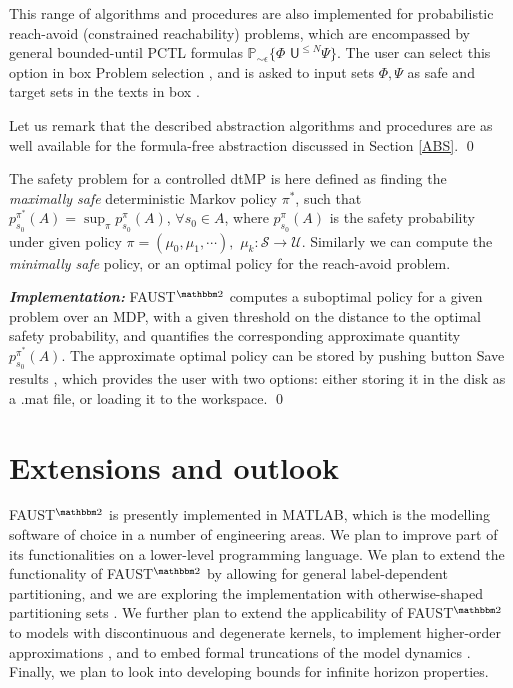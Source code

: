 \documentclass{llncs}
\newcommand*\circled[1]{\tikz[baseline=(char.base)]{\node[shape=circle,draw,inner sep=0.5pt] (char) {#1};}}
\newcommand*\circledb[1]{\tikz[baseline=(char.base)]{\node[shape=circle,draw,inner sep=0.2pt] (char) {#1};}}
\newcommand{\software}{\textsf{FAUST}$^{\mathbbm 2}$\xspace}
\newcommand{\boxname}[1]{\textsf{#1}}
\begin{document}
This range of algorithms and procedures are also implemented for probabilistic reach-avoid (constrained reachability) problems, 
which are encompassed by general bounded-until PCTL formulas $\mathbb P_{\sim\epsilon} \{\Phi\,\, \mathsf{U}^{\leq N} \Psi \}$. 
The user can select this option in box \boxname{Problem selection} \circled{1}, 
and is asked to input sets $\Phi, \Psi$ as safe and target sets in the texts in box \circled{8}.

Let us remark that the described abstraction algorithms and procedures are as well available for the formula-free abstraction discussed in Section \ref{ABS}. 
\qed

The safety problem for a controlled dtMP \cite{tmka2013} is here defined as finding the \emph{maximally safe} deterministic Markov policy $\pi^\ast$, 
such that $p_{s_0}^{\pi^\ast}(A) = \sup_{\pi}p_{s_0}^{\pi}(A)$, $\forall s_0\in A$, 
where $p_{s_0}^{\pi}(A)$ is the safety probability under given policy $\pi = (\mu_0,\mu_1,\cdots),$ $\mu_k:\mathcal S\rightarrow \mathcal U$. 
Similarly we can compute the \emph{minimally safe} policy, 
or an optimal policy for the reach-avoid problem.  

\textit{\textbf{Implementation: }}
\software computes a suboptimal policy for a given problem over an MDP, 
with a given threshold on the distance to the optimal safety probability, 
and quantifies the corresponding approximate quantity $p_{s_0}^{\pi^\ast}(A)$.
The approximate optimal policy can be stored by pushing button \boxname{Save results} \circledb{12}, 
which provides the user with two options: 
either storing it in the disk as a .mat file, 
or loading it to the workspace. 
\qed

\vspace{-0.15in}
\section{Extensions and outlook}
\label{EI}

\software is presently implemented in MATLAB, 
which is the modelling software of choice in a number of engineering areas. 
We plan to improve part of its functionalities on a lower-level programming language.
We plan to extend the functionality of \software by allowing for general label-dependent partitioning,
and we are exploring the implementation with otherwise-shaped partitioning sets \cite{SA13}.
We further plan to extend the applicability of \software to models with 
discontinuous and degenerate \cite{SA12,SATAC12} kernels, 
to implement higher-order approximations \cite{SAH12}, 
and to embed formal truncations of the model dynamics \cite{SA14}.
Finally, we plan to look into developing bounds for infinite horizon properties.
\end{document}
